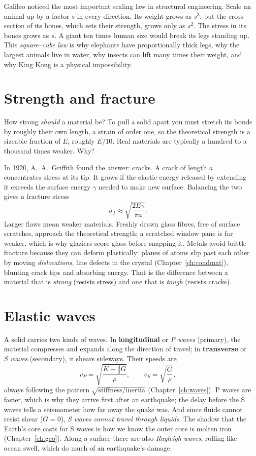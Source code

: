 Galileo noticed the most important scaling law in structural engineering. Scale an animal up by a factor $s$ in every direction. Its weight grows as $s^3$, but the cross-section of its bones, which sets their strength, grows only as $s^2$. The stress in its bones grows as $s$. A giant ten times human size would break its legs standing up. This \emph{square--cube law} is why elephants have proportionally thick legs, why the largest animals live in water, why insects can lift many times their weight, and why King Kong is a physical impossibility.

\section{Strength and fracture}

How strong \emph{should} a material be? To pull a solid apart you must stretch its bonds by roughly their own length, a strain of order one, so the theoretical strength is a sizeable fraction of $E$, roughly $E/10$. Real materials are typically a hundred to a thousand times weaker. Why?

In 1920, A.~A.~Griffith found the answer: cracks. A crack of length $a$ concentrates stress at its tip. It grows if the elastic energy released by extending it exceeds the surface energy $\gamma$ needed to make new surface. Balancing the two gives a fracture stress
\[
  \sigma_f\approx\sqrt{\frac{2E\gamma}{\pi a}}.
\]
Larger flaws mean weaker materials. Freshly drawn glass fibres, free of surface scratches, approach the theoretical strength; a scratched window pane is far weaker, which is why glaziers score glass before snapping it. Metals avoid brittle fracture because they can deform plastically: planes of atoms slip past each other by moving \emph{dislocations}, line defects in the crystal (Chapter~\ref{ch:condmat}), blunting crack tips and absorbing energy. That is the difference between a material that is \emph{strong} (resists stress) and one that is \emph{tough} (resists cracks).

\section{Elastic waves}

A solid carries two kinds of waves. In \textbf{longitudinal} or \emph{P waves} (primary), the material compresses and expands along the direction of travel; in \textbf{transverse} or \emph{S waves} (secondary), it shears sideways. Their speeds are
\[
  v_P = \sqrt{\frac{K + \tfrac43G}{\rho}}, \qquad v_S = \sqrt{\frac{G}{\rho}},
\]
always following the pattern $\sqrt{\text{stiffness}/\text{inertia}}$ (Chapter~\ref{ch:waves}). P waves are faster, which is why they arrive first after an earthquake; the delay before the S waves tells a seismometer how far away the quake was. And since fluids cannot resist shear ($G=0$), \emph{S waves cannot travel through liquids}. The shadow that the Earth's core casts for S waves is how we know the outer core is molten iron (Chapter~\ref{ch:geo}). Along a surface there are also \emph{Rayleigh waves}, rolling like ocean swell, which do much of an earthquake's damage.

